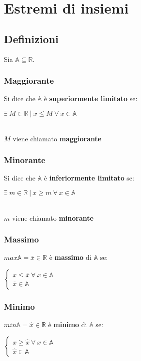 \chapter{Estremi di insiemi}
\section{Definizioni}
Sia $\mathbb{A} \subseteq \mathbb{R}$.
\subsection{Maggiorante}
Si dice che $\mathbb{A}$ è \textbf{superiormente limitato} se:\\
\begin{Large}
$\exists\ M \in \mathbb{R}\ |\ x \leq M\ \forall\ x \in \mathbb{A}$
\end{Large}\\
$M$ viene chiamato \textbf{maggiorante}
\subsection{Minorante}
Si dice che $\mathbb{A}$ è \textbf{inferiormente limitato} se:\\
\begin{Large}
$\exists\ m \in \mathbb{R}\ |\ x \geq m\ \forall\ x \in \mathbb{A}$
\end{Large}\\
$m$ viene chiamato \textbf{minorante}
\subsection{Massimo}
$max\mathbb{A}=\bar{x} \in \mathbb{R}$ è \textbf{massimo} di $\mathbb{A}$ se:\\
\begin{Large}
$\begin{cases}
x \leq \bar{x}\ \forall\ x \in \mathbb{A}\\
\bar{x} \in \mathbb{A}
\end{cases}$
\end{Large}
\subsection{Minimo}
$min\mathbb{A}=\hat{x} \in \mathbb{R}$ è \textbf{minimo} di $\mathbb{A}$ se:\\
\begin{Large}
$\begin{cases}
x \geq \hat{x}\ \forall\ x \in \mathbb{A}\\
\hat{x} \in \mathbb{A}
\end{cases}$
\end{Large}
